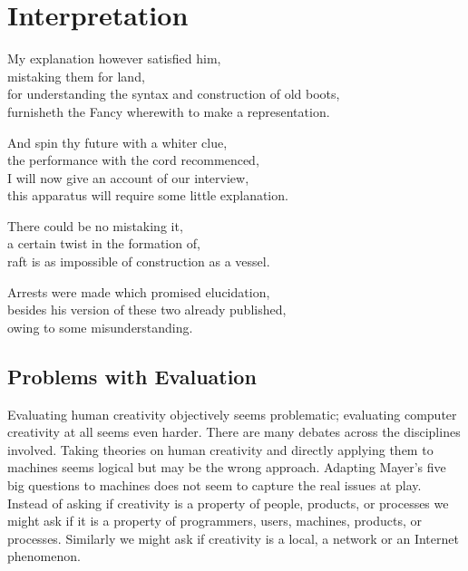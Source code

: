 
\chapter{Interpretation}
\label{ch:interpretation}

\startcontents[chapters]

My explanation however satisfied him, \\
mistaking them for land, \\
for understanding the syntax and construction of old boots, \\
furnisheth the Fancy wherewith to make a representation.

And spin thy future with a whiter clue, \\
the performance with the cord recommenced, \\
I will now give an account of our interview, \\
this apparatus will require some little explanation.

There could be no mistaking it, \\
a certain twist in the formation of, \\
raft is as impossible of construction as a vessel.

Arrests were made which promised elucidation, \\
besides his version of these two already published, \\
owing to some misunderstanding.

\minicontents


\section{Problems with Evaluation}

Evaluating human creativity objectively seems problematic; evaluating computer creativity at all seems even harder. There are many debates across the disciplines involved. Taking theories on human creativity and directly applying them to machines seems logical but may be the wrong approach. Adapting Mayer's five big questions to machines does not seem to capture the real issues at play. Instead of asking if creativity is a property of people, products, or processes we might ask if it is a property of programmers, users, machines, products, or processes. Similarly we might ask if creativity is a local, a network or an Internet phenomenon.

